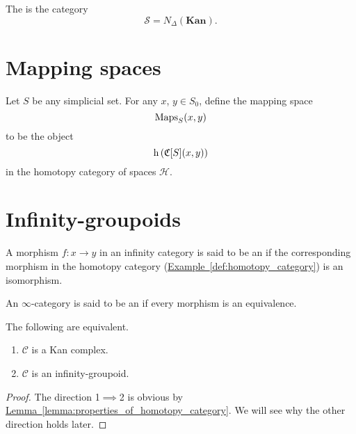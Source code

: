 \documentclass[main.tex]{subfiles}
\begin{document}
\begin{definition}
  \label{def:category_of_spaces}
  The  is the category
  \begin{equation*}
    \mathcal{S} = N_{\Delta}(\textbf{Kan}).
  \end{equation*}
\end{definition}

\section{Mapping spaces}
\label{sec:mapping_spaces}

\begin{definition}
  \label{def:mapping_spaces_of_a_simplicial_set}
  Let $S$ be any simplicial set. For any $x$, $y \in S_{0}$, define the mapping space
  \begin{equation*}
    \operatorname{Maps}_{S}(x, y)
  \end{equation*}
  to be the object
  \begin{equation*}
    \mathrm{h} \left( \mathfrak{C}[S](x, y) \right)
  \end{equation*}
  in the homotopy category of spaces $\mathcal{H}$.
\end{definition}

\section{Infinity-groupoids}
\label{sec:infinity_groupoids}

\begin{definition}[equivalence]
  \label{def:equivalence}
  A morphism $f\colon x \to y$ in an infinity category is said to be an  if the corresponding morphism in the homotopy category (\hyperref[def:homotopy_category]{Example~\ref*{def:homotopy_category}}) is an isomorphism.
\end{definition}

\begin{definition}
  \label{def:infinity_groupoid}
  An $\infty$-category is said to be an  if every morphism is an equivalence.
\end{definition}

\begin{theorem}
  \label{thm:infinity_groupoid_iff_kan_complex}
  The following are equivalent.
  \begin{enumerate}
    \item $\mathcal{C}$ is a Kan complex.

    \item $\mathcal{C}$ is an infinity-groupoid.
  \end{enumerate}
\end{theorem}
\begin{proof}
  The direction 1$\implies$2 is obvious by \hyperref[lemma:properties_of_homotopy_category]{Lemma~\ref*{lemma:properties_of_homotopy_category}}. We will see why the other direction holds later.
\end{proof}
\end{document}
